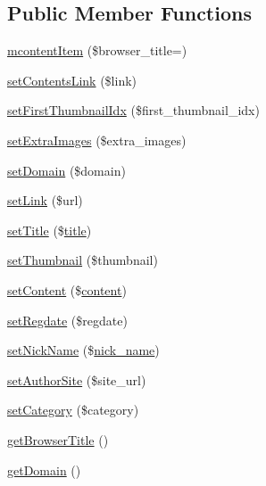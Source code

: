 \subsection*{Public Member Functions}
\begin{DoxyCompactItemize}
\item 
\hyperlink{classmcontentItem_a9cf9b439a6c29b1354b298ab6023ea3e}{mcontent\+Item} (\$browser\+\_\+title=\textquotesingle{}\textquotesingle{})
\item 
\hyperlink{classmcontentItem_a8d8267fc8c63ad032d8dfa694b54d30b}{set\+Contents\+Link} (\$link)
\item 
\hyperlink{classmcontentItem_a97b29510d9386112296071cb06bd68dd}{set\+First\+Thumbnail\+Idx} (\$first\+\_\+thumbnail\+\_\+idx)
\item 
\hyperlink{classmcontentItem_a9907cf978c2b2dafbaeb307faea0874d}{set\+Extra\+Images} (\$extra\+\_\+images)
\item 
\hyperlink{classmcontentItem_adaf816a617e10b21c1b7cfa3080e4a25}{set\+Domain} (\$domain)
\item 
\hyperlink{classmcontentItem_a6c192aee58d7bca3d8933d387309b2ab}{set\+Link} (\$url)
\item 
\hyperlink{classmcontentItem_adb687bee610481753feb8bdd14fab049}{set\+Title} (\$\hyperlink{ko_8install_8php_a5b072c5fd1d2228c6ba5cee13cd142e3}{title})
\item 
\hyperlink{classmcontentItem_a956c763f26136b4e7a96ab07c04a1957}{set\+Thumbnail} (\$thumbnail)
\item 
\hyperlink{classmcontentItem_afb9763a013942bd40ab5a3b1c7491910}{set\+Content} (\$\hyperlink{classcontent}{content})
\item 
\hyperlink{classmcontentItem_aeb646f2283bfb0a13b7d9f544058f962}{set\+Regdate} (\$regdate)
\item 
\hyperlink{classmcontentItem_a4b702963538643aac56d9a3312a06bee}{set\+Nick\+Name} (\$\hyperlink{ko_8install_8php_a151ecae87a1f3d7e257aa089803086bd}{nick\+\_\+name})
\item 
\hyperlink{classmcontentItem_adaa9ad60dd8f5373b9f2258a6effe70c}{set\+Author\+Site} (\$site\+\_\+url)
\item 
\hyperlink{classmcontentItem_a004c63ef8da549d29d201b4946372c5e}{set\+Category} (\$category)
\item 
\hyperlink{classmcontentItem_a6fe964acc2f33039f90a6ed33ae03ba9}{get\+Browser\+Title} ()
\item 
\hyperlink{classmcontentItem_a29a4fb4f4bedd748ec93238be37a22fb}{get\+Domain} ()
\item 

\end{DoxyCompactItemize}
